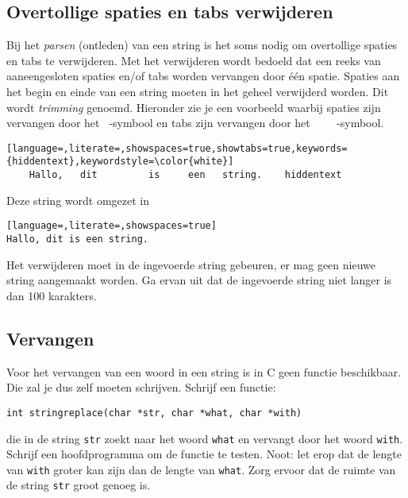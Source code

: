 \documentclass[a4paper,10pt,fleqn,twoside]{article}
\begin{document}
\subsection{Overtollige spaties en tabs verwijderen}
Bij het \textsl{parsen} (ontleden) van een string is het soms nodig om overtollige spaties en tabs te verwijderen. Met het verwijderen wordt bedoeld dat een reeks van aaneengesloten spaties en/of tabs worden vervangen door één spatie. Spaties aan het begin en einde van een string moeten in het geheel verwijderd worden. Dit wordt \textsl{trimming} genoemd. Hieronder zie je een voorbeeld waarbij spaties zijn vervangen door het \lstinline[keepspaces=true,columns=fixed,showspaces=true]| |-symbool en tabs zijn vervangen door het \lstinline[showspaces=true,showtabs=true]|	|-symbool.

\begin{lstlisting}[language=,literate=,showspaces=true,showtabs=true,keywords={hiddentext},keywordstyle=\color{white}]
    Hallo,   dit 	 	 is  	een   string.    hiddentext
\end{lstlisting}

Deze string wordt omgezet in

\begin{lstlisting}[language=,literate=,showspaces=true]
Hallo, dit is een string.
\end{lstlisting}

Het verwijderen moet in de ingevoerde string gebeuren, er mag geen nieuwe string aangemaakt worden.
Ga ervan uit dat de ingevoerde string niet langer is dan 100 karakters.

\subsection{Vervangen}
Voor het vervangen van een woord in een string is in C geen functie beschikbaar. Die zal je dus zelf moeten schrijven. Schrijf een functie:

\begin{lstlisting}
int stringreplace(char *str, char *what, char *with)
\end{lstlisting}

die in de string \lstinline|str| zoekt naar het woord \lstinline|what| en vervangt door het woord \lstinline|with|. Schrijf een hoofdprogramma om de functie te testen. Noot: let erop dat de lengte van \lstinline|with| groter kan zijn dan de lengte van \lstinline|what|. Zorg ervoor dat de ruimte van de string \lstinline|str| groot genoeg is.
\end{document}
